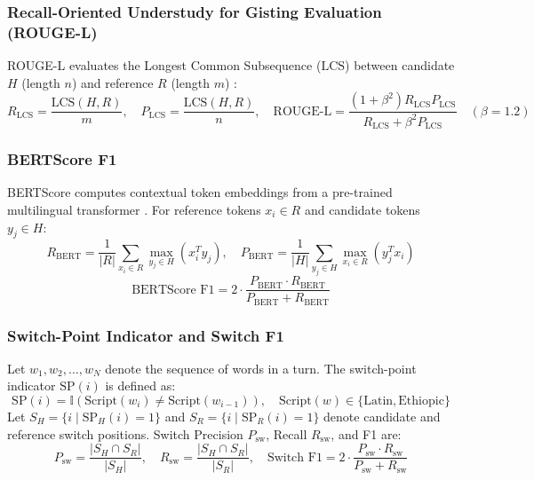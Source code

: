 \documentclass[11pt,a4paper]{article}
\begin{document}
\subsubsection{Recall-Oriented Understudy for Gisting Evaluation (ROUGE-L)}
ROUGE-L evaluates the Longest Common Subsequence ($\text{LCS}$) between candidate $H$ (length $n$) and reference $R$ (length $m$) \cite{lin2004rouge}:
\begin{equation}
    R_{\text{LCS}} = \frac{\text{LCS}(H, R)}{m}, \quad P_{\text{LCS}} = \frac{\text{LCS}(H, R)}{n}, \quad \text{ROUGE-L} = \frac{(1 + \beta^2) R_{\text{LCS}} P_{\text{LCS}}}{R_{\text{LCS}} + \beta^2 P_{\text{LCS}}} \quad (\beta = 1.2)
\end{equation}

\subsubsection{BERTScore F1}
BERTScore computes contextual token embeddings from a pre-trained multilingual transformer \cite{zhang2020bertscore}. For reference tokens $x_i \in R$ and candidate tokens $y_j \in H$:
\begin{equation}
    R_{\text{BERT}} = \frac{1}{|R|} \sum_{x_i \in R} \max_{y_j \in H} (x_i^T y_j), \quad P_{\text{BERT}} = \frac{1}{|H|} \sum_{y_j \in H} \max_{x_i \in R} (y_j^T x_i)
\end{equation}
\begin{equation}
    \text{BERTScore F1} = 2 \cdot \frac{P_{\text{BERT}} \cdot R_{\text{BERT}}}{P_{\text{BERT}} + R_{\text{BERT}}}
\end{equation}

\subsubsection{Switch-Point Indicator and Switch F1}
Let $w_1, w_2, \dots, w_N$ denote the sequence of words in a turn. The switch-point indicator $\text{SP}(i)$ is defined as:
\begin{equation}
    \text{SP}(i) = \mathbb{I}\left( \text{Script}(w_i) \neq \text{Script}(w_{i-1}) \right), \quad \text{Script}(w) \in \{ \text{Latin}, \text{Ethiopic} \}
\end{equation}
Let $S_H = \{i \mid \text{SP}_H(i) = 1\}$ and $S_R = \{i \mid \text{SP}_R(i) = 1\}$ denote candidate and reference switch positions. Switch Precision $P_{\text{sw}}$, Recall $R_{\text{sw}}$, and F1 are:
\begin{equation}
    P_{\text{sw}} = \frac{|S_H \cap S_R|}{|S_H|}, \quad R_{\text{sw}} = \frac{|S_H \cap S_R|}{|S_R|}, \quad \text{Switch F1} = 2 \cdot \frac{P_{\text{sw}} \cdot R_{\text{sw}}}{P_{\text{sw}} + R_{\text{sw}}}
\end{equation}
\end{document}
